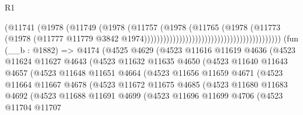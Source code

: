 \begin{lexlean}{R1}
\begin{coremodule}
                                                                    (@11741
                                                                      (@1978
                                                                        (@11749
                                                                          (@1978
                                                                            (@11757
                                                                              (@1978
                                                                                (@11765
                                                                                  (@1978
                                                                                    (@11773
                                                                                      (@1978
                                                                                        (@11777
                                                                                          @11779
                                                                                          @3842
                                                                                          @1974)))))))))))))))))))))))))))))))))))))))))))
    (fun (__b : @1882) =>
    @4174
      (@4525
        @4629
        (@4523
          @11616
          @11619
          @4636
          (@4523
            @11624
            @11627
            @4643
            (@4523
              @11632
              @11635
              @4650
              (@4523
                @11640
                @11643
                @4657
                (@4523
                  @11648
                  @11651
                  @4664
                  (@4523
                    @11656
                    @11659
                    @4671
                    (@4523
                      @11664
                      @11667
                      @4678
                      (@4523
                        @11672
                        @11675
                        @4685
                        (@4523
                          @11680
                          @11683
                          @4692
                          (@4523
                            @11688
                            @11691
                            @4699
                            (@4523
                              @11696
                              @11699
                              @4706
                              (@4523
                                @11704
                                @11707

\end{coremodule}
\end{lexlean}
